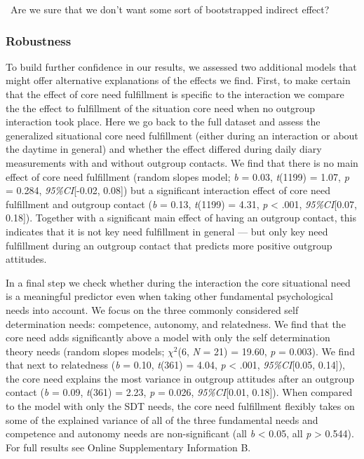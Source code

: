 \faQuestionCircle~Are we sure that we don't want some sort of
bootstrapped indirect effect?

\subsubsection{Robustness}

To build further confidence in our results, we assessed two additional
models that might offer alternative explanations of the effects we find.
First, to make certain that the effect of core need fulfillment is
specific to the interaction we compare the the effect to fulfillment of
the situation core need when no outgroup interaction took place. Here we
go back to the full dataset and assess the generalized situational core
need fulfillment (either during an interaction or about the daytime in
general) and whether the effect differed during daily diary measurements
with and without outgroup contacts. We find that there is no main effect
of core need fulfillment (random slopes model; \textit{b} = 0.03,
\textit{t}(1199) = 1.07, \textit{p} = 0.284, \textit{95\%CI}{[}-0.02,
0.08{]}) but a significant interaction effect of core need fulfillment
and outgroup contact (\textit{b} = 0.13, \textit{t}(1199) = 4.31,
\textit{p} \textless{} .001, \textit{95\%CI}{[}0.07, 0.18{]}). Together
with a significant main effect of having an outgroup contact, this
indicates that it is not key need fulfillment in general --- but only
key need fulfillment during an outgroup contact that predicts more
positive outgroup attitudes.

In a final step we check whether during the interaction the core
situational need is a meaningful predictor even when taking other
fundamental psychological needs into account. We focus on the three
commonly considered self determination needs: competence, autonomy, and
relatedness. We find that the core need adds significantly above a model
with only the self determination theory needs (random slopes models;
\(\chi^2\)(6, \textit{N} = 21) = 19.60, \textit{p} = 0.003). We find
that next to relatedness (\textit{b} = 0.10, \textit{t}(361) = 4.04,
\textit{p} \textless{} .001, \textit{95\%CI}{[}0.05, 0.14{]}), the core
need explains the most variance in outgroup attitudes after an outgroup
contact (\textit{b} = 0.09, \textit{t}(361) = 2.23, \textit{p} = 0.026,
\textit{95\%CI}{[}0.01, 0.18{]}). When compared to the model with only
the SDT needs, the core need fulfillment flexibly takes on some of the
explained variance of all of the three fundamental needs and competence
and autonomy needs are non-significant (all \textit{b} \textless{} 0.05,
all \textit{p} \textgreater{} 0.544). For full results see Online
Supplementary Information B.


